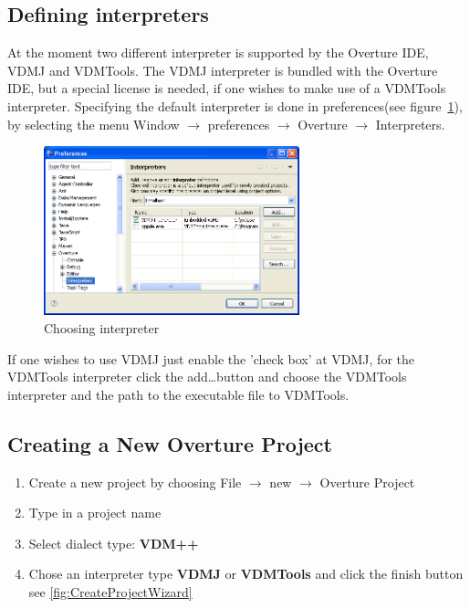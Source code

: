 \subsection{Defining interpreters}

At the moment two different interpreter is supported by the Overture IDE, VDMJ
and VDMTools. The VDMJ interpreter is bundled with the Overture IDE, but a
special license is needed, if one wishes to make use of a VDMTools
interpreter. Specifying the default interpreter is done in preferences(see
figure~\ref{fig:userguide:PreferencesInterpreters}), by selecting the menu 
Window $ \rightarrow $ preferences $ \rightarrow $ Overture $ \rightarrow $
Interpreters.

\begin{figure}[htp]
\begin{center}
  \includegraphics[width=280px]{figures/PreferencesInterpreters}
  \caption{Choosing interpreter}
  \label{fig:userguide:PreferencesInterpreters}
\end{center}
\end{figure}

If one wishes to use VDMJ just enable the 'check box' at VDMJ, for the VDMTools
interpreter click the add\ldots button and choose the VDMTools interpreter and
the path to the executable file to VDMTools.

\subsection{Creating a New Overture Project}
\begin{enumerate}
	\item Create a new project by choosing File $\rightarrow$ new $\rightarrow$
	Overture Project 
	\item Type in a project name
	\item Select dialect type: \textbf{VDM++} 
	\item Chose an interpreter type \textbf{VDMJ} or \textbf{VDMTools} and click
	the finish button see \ref{fig:CreateProjectWizard}
\end{enumerate}

